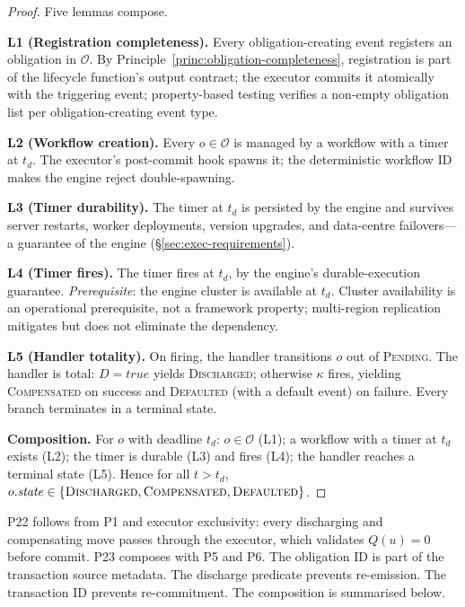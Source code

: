 \begin{proof}
Five lemmas compose.

\textbf{L1 (Registration completeness).} Every obligation-creating event registers an obligation in $\mathcal{O}$. By Principle~\ref{princ:obligation-completeness}, registration is part of the lifecycle function's output contract; the executor commits it atomically with the triggering event; property-based testing verifies a non-empty obligation list per obligation-creating event type.

\textbf{L2 (Workflow creation).} Every $o \in \mathcal{O}$ is managed by a workflow with a timer at $t_d$. The executor's post-commit hook spawns it; the deterministic workflow ID makes the engine reject double-spawning.

\textbf{L3 (Timer durability).} The timer at $t_d$ is persisted by the engine and survives server restarts, worker deployments, version upgrades, and data-centre failovers---a guarantee of the engine (\S\ref{sec:exec-requirements}).

\textbf{L4 (Timer fires).} The timer fires at $t_d$, by the engine's durable-execution guarantee. \textit{Prerequisite}: the engine cluster is available at $t_d$. Cluster availability is an operational prerequisite, not a framework property; multi-region replication mitigates but does not eliminate the dependency.

\textbf{L5 (Handler totality).} On firing, the handler transitions $o$ out of \textsc{Pending}. The handler is total: $D = \mathit{true}$ yields \textsc{Discharged}; otherwise $\kappa$ fires, yielding \textsc{Compensated} on success and \textsc{Defaulted} (with a default event) on failure. Every branch terminates in a terminal state.

\textbf{Composition.} For $o$ with deadline $t_d$: $o \in \mathcal{O}$ (L1); a workflow with a timer at $t_d$ exists (L2); the timer is durable (L3) and fires (L4); the handler reaches a terminal state (L5). Hence for all $t > t_d$, $o.\mathit{state} \in \{\textsc{Discharged}, \textsc{Compensated}, \textsc{Defaulted}\}$.
\end{proof}

\noindent P22 follows from P1 and executor exclusivity: every discharging and compensating move passes through the executor, which validates $Q(u)=0$ before commit. P23 composes with P5 and P6. The obligation ID is part of the transaction source metadata. The discharge predicate prevents re-emission. The transaction ID prevents re-commitment. The composition is summarised below.

